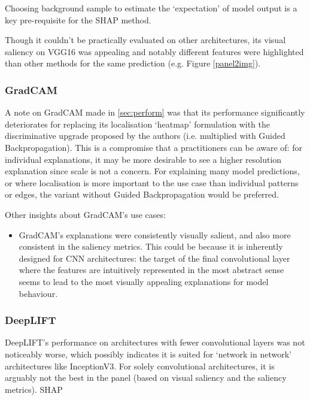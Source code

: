 \documentclass[main]{subfiles}
\begin{document}
Choosing background sample to estimate the `expectation' of model output is a key pre-requisite for the SHAP method.


Though it couldn't be practically evaluated on other architectures, its visual saliency on VGG16 was appealing and notably different features were highlighted than other methods for the same prediction (e.g. Figure \ref{panel2img}).


\subsubsection{GradCAM}
A note on GradCAM made in \ref{sec:perform} was that its performance significantly deteriorates for replacing its localisation `heatmap' formulation with the discriminative upgrade proposed by the authors (i.e. multiplied with Guided Backpropagation). This is a compromise that a practitioners can be aware of: for individual explanations, it may be more desirable to see a higher resolution explanation since scale is not a concern. For explaining many model predictions, or where localisation is more important to the use case than individual patterns or edges, the variant without Guided Backpropagation would be preferred.

Other insights about GradCAM's use cases:
\begin{itemize}
\item GradCAM's explanations were consistently visually salient, and also more consistent in the saliency metrics. This could be because it is inherently designed for CNN architectures: the target of the final convolutional layer where the features are intuitively represented in the most abstract sense seems to lead to the most visually appealing explanations for model behaviour.
\end{itemize}

\subsubsection{DeepLIFT}

DeepLIFT's performance on architectures with fewer convolutional layers was not noticeably worse, which possibly indicates it is suited for `network in network' architectures like InceptionV3. For solely convolutional architectures, it is arguably not the best in the panel (based on visual saliency and the saliency metrics). SHAP 

\end{document}
